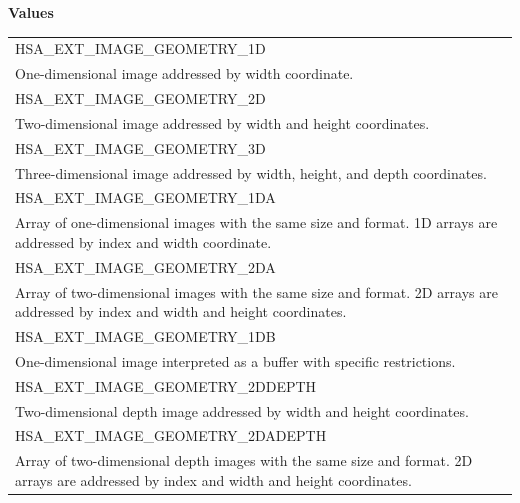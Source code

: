 \documentclass[final]{book}
\newcommand{\reftyp}[1]{#1}
\newcommand{\refenu}[1]{\reftyp{#1}}
\begin{document}
\noindent\textbf{Values}\\[-5mm]
\begin{longtable}{@{\hspace{2em}}p{\linewidth-2em}}
\hspace{-2em}\refenu{HSA_\-EXT_\-IMAGE_\-GEOMETRY_\-1D}\\One-dimensional image addressed by width coordinate.\\[2mm]
\hspace{-2em}\refenu{HSA_\-EXT_\-IMAGE_\-GEOMETRY_\-2D}\\Two-dimensional image addressed by width and height coordinates.\\[2mm]
\hspace{-2em}\refenu{HSA_\-EXT_\-IMAGE_\-GEOMETRY_\-3D}\\Three-dimensional image addressed by width, height, and depth coordinates.\\[2mm]
\hspace{-2em}\refenu{HSA_\-EXT_\-IMAGE_\-GEOMETRY_\-1DA}\\Array of one-dimensional images with the same size and format. 1D arrays are addressed by index and width coordinate.\\[2mm]
\hspace{-2em}\refenu{HSA_\-EXT_\-IMAGE_\-GEOMETRY_\-2DA}\\Array of two-dimensional images with the same size and format. 2D arrays are addressed by index and width and height coordinates.\\[2mm]
\hspace{-2em}\refenu{HSA_\-EXT_\-IMAGE_\-GEOMETRY_\-1DB}\\One-dimensional image interpreted as a buffer with specific restrictions.\\[2mm]
\hspace{-2em}\refenu{HSA_\-EXT_\-IMAGE_\-GEOMETRY_\-2DDEPTH}\\Two-dimensional depth image addressed by width and height coordinates.\\[2mm]
\hspace{-2em}\refenu{HSA_\-EXT_\-IMAGE_\-GEOMETRY_\-2DADEPTH}\\Array of two-dimensional depth images with the same size and format. 2D arrays are addressed by index and width and height coordinates.
\end{longtable}
\end{document}
